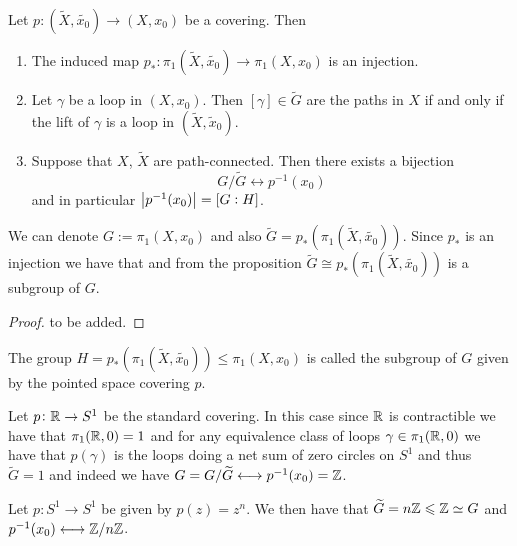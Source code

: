 \documentclass[11pt,a4paper]{article}
\begin{document}
\begin{proposition}
  Let $p \colon (\widetilde X, \tilde{x_0}) \to (X, x_0)$ be a covering.
  Then
  \begin{enumerate}
    \item[(1)] The induced map
      $p_* \colon \pi_1(\widetilde X, \tilde{x_0}) \to \pi_1(X,x_0)$ is an
      injection.
    \item[(2)] Let $\gamma$ be a loop in $(X,x_0)$.
      Then $[\gamma] \in \widetilde G$ are the paths in $X$ if and only
      if the lift of $\gamma$ is a loop in $(\widetilde X, \tilde x_0)$.
    \item[(3)] Suppose that $X$, $\widetilde X$ are path-connected.
      Then there exists a bijection
      \[
        G / \widetilde G \longleftrightarrow p^{-1}(x_0)
      \]
      and in particular $\left\lvert p^{-1}(x_0)\right\rvert = [G:H]$.
  \end{enumerate}
\end{proposition}
\begin{remark}
  We can denote $G := \pi_1(X,x_0)$ and
  also $\widetilde G = p_*(\pi_1(\widetilde X, \tilde{x_0}))$.
  Since $p_*$ is an injection we have that and from the proposition
  $\widetilde G \cong p_*(\pi_1(\widetilde X, \tilde{x_0}))$ is a subgroup
  of $G$.
\end{remark}
\begin{proof}
  to be added.
\end{proof}

\begin{definition} %
  The group $H = p_*(\pi_1(\widetilde X, \tilde{x_0})) \leqslant \pi_1(X,x_0)$
  is called the subgroup of $G$ given by the pointed space covering $p$.
\end{definition}

\begin{example}
  Let $p \colon \mathbb{R} \to S^1$ be the standard covering.
  In this case since $\mathbb{R}$ is contractible we have that
  $\pi_1(\mathbb{R},0) = 1$ and for any equivalence class of loops
  $\gamma \in \pi_1(\mathbb{R},0)$ we have that $p(\gamma)$ is the loops doing
  a net sum of zero circles on $S^1$ and thus $\widetilde G = 1$
  and indeed we have $G = G / \widetilde G \longleftrightarrow p^{-1}(x_0) = \mathbb{Z}$.
\end{example}

\begin{example}
  Let $p \colon S^1 \to S^1$ be given by $p(z) = z^n$.
  We then have that
  $\widetilde G = n\mathbb{Z} \leqslant \mathbb{Z} \simeq G$ and
  $p^{-1}(x_0) \longleftrightarrow \mathbb{Z}/n\mathbb{Z}$.
\end{example}
\end{document}
